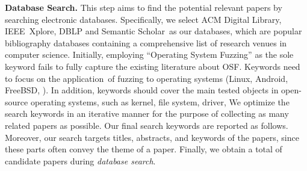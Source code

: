 \textbf{Database Search.} 
This step aims to find the potential relevant papers by searching electronic databases. Specifically, we select ACM Digital Library, IEEE~Xplore, DBLP and Semantic Scholar~as our databases, which are popular bibliography databases containing a comprehensive list of research venues in computer science. 
Initially, employing ``Operating System Fuzzing'' as the sole keyword fails to fully capture the existing literature about OSF. Keywords need to focus on the application~of fuzzing to operating systems (\eg Linux, Android, FreeBSD, \etc).  In addition, keywords should cover the main tested objects in open-source operating systems, such as kernel, file system, driver, \etc We optimize the search keywords in an iterative manner for the purpose of collecting as many related papers as possible. Our final search keywords are reported as follows. Moreover, our search targets titles, abstracts, and keywords of the papers, since these parts often convey the theme of a paper. Finally, we obtain a total of  candidate papers during \emph{database search}. 

